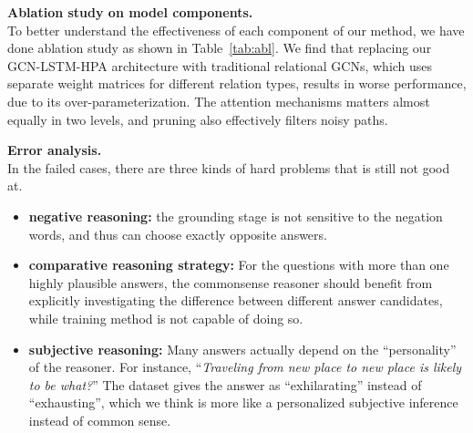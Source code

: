 \documentclass[11pt,a4paper]{article}
\begin{document}
\smallskip
\noindent
\textbf{Ablation study on model components.} \\
To better understand the effectiveness of each component of our method, we have done ablation study as shown in Table~\ref{tab:abl}.
We find that replacing our GCN-LSTM-HPA architecture with traditional relational GCNs, which uses separate weight matrices for different relation types, results in worse performance, due to its over-parameterization.
The attention mechanisms matters almost equally in two levels, and pruning also effectively filters noisy paths.

\smallskip
\noindent
\textbf{Error analysis.} \\
In the failed cases, there are three kinds of hard problems that \KagNet is still not good at.
\begin{itemize}
    \item \textbf{negative reasoning:} the grounding stage is not sensitive to the negation words, and thus can choose exactly opposite answers.
    \item \textbf{comparative reasoning strategy:} 
    For the questions with more than one highly plausible answers, the commonsense reasoner should benefit from explicitly investigating the difference between different answer candidates, while \KagNet training method is not capable of doing so.
    
    \item \textbf{subjective reasoning:} Many answers actually depend on the ``personality'' of the reasoner. 
    For instance, ``\textit{Traveling from new place to new place is likely to be what?}'' 
    The dataset gives the answer as ``exhilarating'' instead of ``exhausting'', which we think is more like a personalized subjective inference instead of common sense.
    
\end{itemize}

\begin{table}[t]
	\centering
	\caption{Ablation study on the \KagNet framework. }
	\label{tab:abl}
\end{table}
\end{document}
